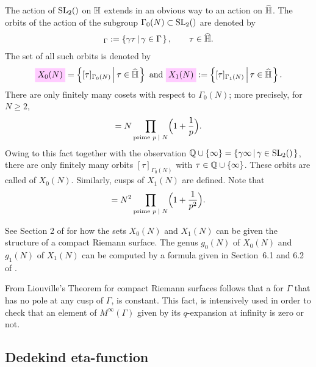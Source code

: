\documentclass{article}
\begin{document}
The action of $\SL2Z$ on $\mathbb{H}$ extends in an obvious way to an
action on $\widehat{\mathbb{H}}$. The orbits of the action of the subgroup
$\Gamma_0(N)\subset \SL2Z$ are denoted by
\begin{gather*} [\tau]_\Gamma :=
  \SetDef{\gamma\tau}{\gamma\in\Gamma},\qquad\tau\in\setHhat.
\end{gather*}
The set of all such orbits is denoted by
\begin{gather*}
  \defineNotation[X-0]{X_0(N)} = \SetDef{[\tau]_{\Gamma_0(N)}}{\tau\in\setHhat}
  \text{ and }
  \defineNotation[X-1]{X_1(N)} := \SetDef{[\tau]_{\Gamma_1(N)}}{\tau\in\setHhat}.
\end{gather*}
There are only finitely many cosets with respect
to $\Gamma_0(N)$; more precisely, for $N\ge2$,
\begin{gather*}
  [\SL2Z : \Gamma_0(N)]
  =
  N \prod_{\text{prime $\divides{p}{N}$}} \Bigl(1+\frac{1}{p}\Bigr).
\end{gather*}
Owing to this fact together with the observation
$\setQ\cup\{\infty\}=\SetDef{\gamma\infty}{\gamma\in\SL2Z}$,
%
there are only finitely many orbits $[\tau]_{\Gamma_0(N)}$ with
$\tau\in\mathbb{Q}\cup\left\{\infty\right\}$. These orbits are called
 of $X_0(N)$.
Similarly, cusps of $X_1(N)$ are defined. Note that
\begin{gather*}
  [\SL2Z : \Gamma_1(N)]
  =
  N^2 \prod_{\text{prime $\divides{p}{N}$}} \Bigl(1+\frac{1}{p^2}\Bigr).
\end{gather*}

See Section 2 of \cite{DiamondShurman_ModularForms_2005} for how the
sets $X_0(N)$ and $X_1(N)$ can be given the structure of a compact
Riemann surface. The genus $g_0(N)$ of $X_0(N)$ and $g_1(N)$ of
$X_1(N)$ can be computed by a formula given in Section~6.1 and 6.2 of
\cite{Stein_ModularFormas_2007}.

From Liouville's Theorem for compact Riemann surfaces follows that a
 for $\Gamma$ that has no pole at any cusp
of $\Gamma$, is constant. This fact, is intensively used in order to
check that an element of $M^\infty(\Gamma)$ given by its $q$-expansion
at infinity is zero or not.




\subsection{Dedekind eta-function}
\end{document}
